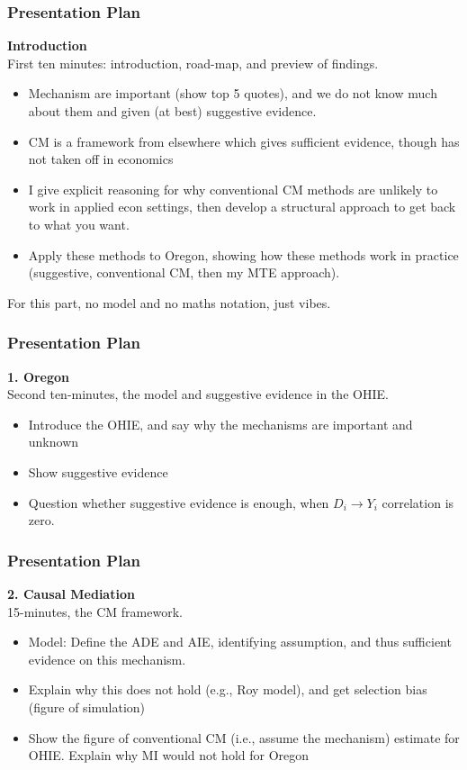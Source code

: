 \documentclass[dvipsnames,handout]{beamer} %
\begin{document}
\begin{frame}
    \frametitle{Presentation Plan}
    \textbf{Introduction} \\
    First ten minutes: introduction, road-map, and preview of findings.
    \begin{itemize}
        \item Mechanism are important (show top 5 quotes), and we do not know much about them and given (at best) suggestive evidence.
        \item CM is a framework from elsewhere which gives sufficient evidence, though has not taken off in economics
        \item I give explicit reasoning for why conventional CM methods are unlikely to work in applied econ settings, then develop a structural approach to get back to what you want.
        \item Apply these methods to Oregon, showing how these methods work in practice (suggestive, conventional CM, then my MTE approach).
    \end{itemize}
    For this part, no model and no maths notation, just vibes.
\end{frame}
\begin{frame}
\frametitle{Presentation Plan}
    \textbf{1. Oregon} \\
    Second ten-minutes, the model and suggestive evidence in the OHIE.
    \begin{itemize}
        \item Introduce the OHIE, and say why the mechanisms are important and unknown
        \item Show suggestive evidence
        \item Question whether suggestive evidence is enough, when $D_i \to Y_i$ correlation is zero. 
    \end{itemize}
\end{frame}
\begin{frame}
\frametitle{Presentation Plan}
    \textbf{2. Causal Mediation} \\
    15-minutes, the CM framework. 
    \begin{itemize}
        \item Model: Define the ADE and AIE, identifying assumption, and thus sufficient evidence on this mechanism.
        \item Explain why this does not hold (e.g., Roy model), and get selection bias (figure of simulation)
        \item Show the figure of conventional CM (i.e., assume the mechanism) estimate for OHIE.  Explain why MI would not hold for Oregon
    \end{itemize}
\end{frame}
\end{document}
